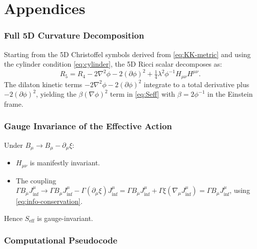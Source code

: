 \documentclass[12pt,a4paper]{article}
\newcommand{\lam}{\lambda}         %
\newcommand{\Seff}{S_{\text{eff}}} %
\begin{document}
\part*{Appendices}

\appendix

\section{Full 5D Curvature Decomposition}
\label{app:curvature}

Starting from the 5D Christoffel symbols derived from \eqref{eq:KK-metric} and
using the cylinder condition \eqref{eq:cylinder}, the 5D Ricci scalar
decomposes as:
\begin{equation}
  R_5 = R_4 - 2\nabla^2\phi - 2(\partial\phi)^2
        + \tfrac{1}{4}\lam^2\phi^{-1} H_{\mu\nu}H^{\mu\nu} .
  \label{app:eq:R5}
\end{equation}
The dilaton kinetic terms $-2\nabla^2\phi - 2(\partial\phi)^2$ integrate to a
total derivative plus $-2(\partial\phi)^2$, yielding the $\beta(\nabla\phi)^2$
term in \eqref{eq:Seff} with $\beta = 2\phi^{-1}$ in the Einstein frame.

\section{Gauge Invariance of the Effective Action}
\label{app:gauge}

Under $B_\mu \to B_\mu - \partial_\mu\xi$:
\begin{itemize}
  \item $H_{\mu\nu}$ is manifestly invariant.
  \item The coupling $\Gamma B_\mu J_{\inf}^\mu \to \Gamma B_\mu J_{\inf}^\mu
        - \Gamma (\partial_\mu\xi) J_{\inf}^\mu = \Gamma B_\mu J_{\inf}^\mu
        + \Gamma\xi(\nabla_\mu J_{\inf}^\mu) = \Gamma B_\mu J_{\inf}^\mu$,
        using \eqref{eq:info-conservation}.
\end{itemize}
Hence $\Seff$ is gauge-invariant.

\section{Computational Pseudocode}
\label{app:code}
\end{document}
